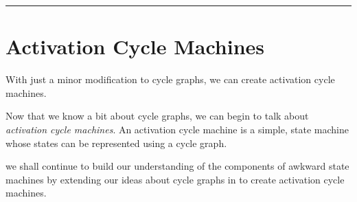 \documentclass[a4paper,12pt]{article}
\begin{document}
\begin{center}
\noindent\rule{8cm}{0.4pt}
\end{center}

\section{Activation Cycle Machines}
With just a minor modification to cycle graphs, we can create activation cycle machines.

Now that we know a bit about cycle graphs, we can begin to talk about \textit{activation cycle machines}. An activation cycle machine is a simple, state machine whose states can be represented using a cycle graph.

we shall continue to build our understanding of the components of awkward state machines by extending our ideas about cycle graphs in to create activation cycle machines.\\
\\
\end{document}

